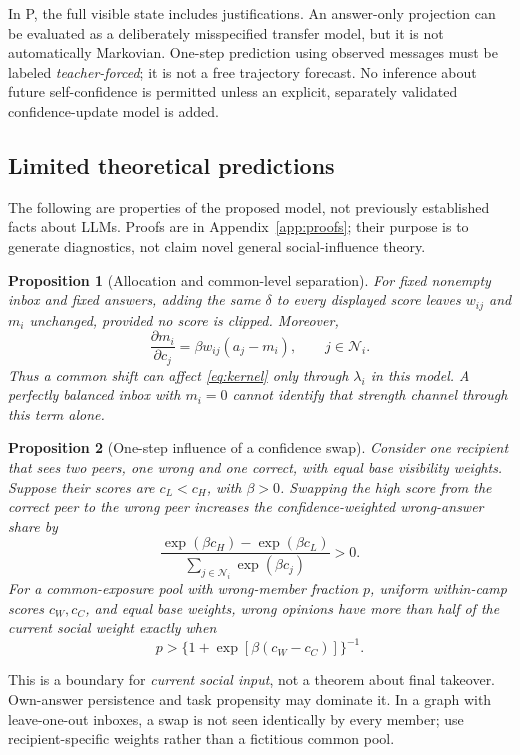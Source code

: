 \documentclass[11pt]{article}
\newtheorem{proposition}{Proposition}
\newcommand{\calN}{\mathcal N}
\begin{document}
In P, the full visible state includes justifications. An answer-only projection can be evaluated as a deliberately misspecified transfer model, but it is not automatically Markovian. One-step prediction using observed messages must be labeled \emph{teacher-forced}; it is not a free trajectory forecast. No inference about future self-confidence is permitted unless an explicit, separately validated confidence-update model is added.

\subsection{Limited theoretical predictions}
The following are properties of the proposed model, not previously established facts about LLMs. Proofs are in Appendix~\ref{app:proofs}; their purpose is to generate diagnostics, not claim novel general social-influence theory.

\begin{proposition}[Allocation and common-level separation]
\label{prop:invariance}
For fixed nonempty inbox and fixed answers, adding the same $\delta$ to every displayed score leaves $w_{ij}$ and $m_i$ unchanged, provided no score is clipped. Moreover,
\[
 \frac{\partial m_i}{\partial c_j}=\beta w_{ij}(a_j-m_i),\qquad j\in\calN_i.
\]
Thus a common shift can affect \eqref{eq:kernel} only through $\lambda_i$ in this model. A perfectly balanced inbox with $m_i=0$ cannot identify that strength channel through this term alone.
\end{proposition}

\begin{proposition}[One-step influence of a confidence swap]
\label{prop:swap}
Consider one recipient that sees two peers, one wrong and one correct, with equal base visibility weights. Suppose their scores are $c_L<c_H$, with $\beta>0$. Swapping the high score from the correct peer to the wrong peer increases the confidence-weighted wrong-answer share by
\[
 \frac{\exp(\beta c_H)-\exp(\beta c_L)}{\sum_{j\in\calN_i}\exp(\beta c_j)}>0.
\]
For a common-exposure pool with wrong-member fraction $p$, uniform within-camp scores $c_W,c_C$, and equal base weights, wrong opinions have more than half of the current social weight exactly when
\begin{equation}
 p>\{1+\exp[\beta(c_W-c_C)]\}^{-1}.
 \label{eq:boundary}
\end{equation}
\end{proposition}
This is a boundary for \emph{current social input}, not a theorem about final takeover. Own-answer persistence and task propensity may dominate it. In a graph with leave-one-out inboxes, a swap is not seen identically by every member; use recipient-specific weights rather than a fictitious common pool.
\end{document}

